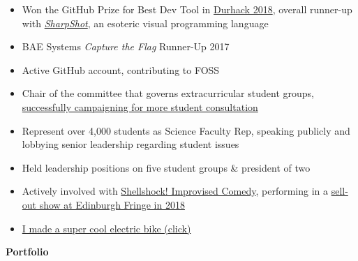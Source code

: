 \documentclass[hidelinks, 12pt, a4paper]{article}
\newcommand{\smitem}[1]{\item {\small {#1}}}
\newenvironment{bullets}{\begin{minipage}[t]{\linewidth}\begin{itemize}[leftmargin=2em,label=-,nosep]}{\end{itemize}\end{minipage}\vspace{2pt}}
\begin{document}
\begin{minipage}{0.58\textwidth}
		\begin{bullets}
			\smitem{Won the GitHub Prize for Best Dev Tool in \href{https://durhack.com}{Durhack 2018}, overall runner-up with \href{https://github.com/motherlymuppet/sharpshot}{\emph{SharpShot}}, an esoteric visual programming language}
			\smitem{BAE Systems \emph{Capture the Flag} Runner-Up 2017}
			\smitem{Active GitHub account, contributing to FOSS}\\
			\smitem{Chair of the committee that governs extracurricular student groups, \href{https://www.thebubble.org.uk/current-affairs/student-life/motion-voted-down-by-outraged-assembly/}{successfully campaigning for more student consultation}}
			\smitem{Represent over 4,000 students as Science Faculty Rep, speaking publicly and lobbying senior leadership regarding student issues}
			\smitem{Held leadership positions on five student groups \& president of two}\\
			\smitem{Actively involved with \href{http://community.dur.ac.uk/dur.improv/}{Shellshock! Improvised Comedy}, performing in a \href{https://tickets.edfringe.com/whats-on/here-be-improv}{sell-out show at Edinburgh Fringe in 2018}}
			\smitem{\href{https://i.imgur.com/4Uz2USm.jpg}{I made a super cool electric bike (click)}}
		\end{bullets}
	\end{minipage}
	
	\newpage
	
	\vspace*{12pt}
	
	\begin{center}
		\Huge \textbf{Portfolio}
	\end{center}
	
\end{document}
